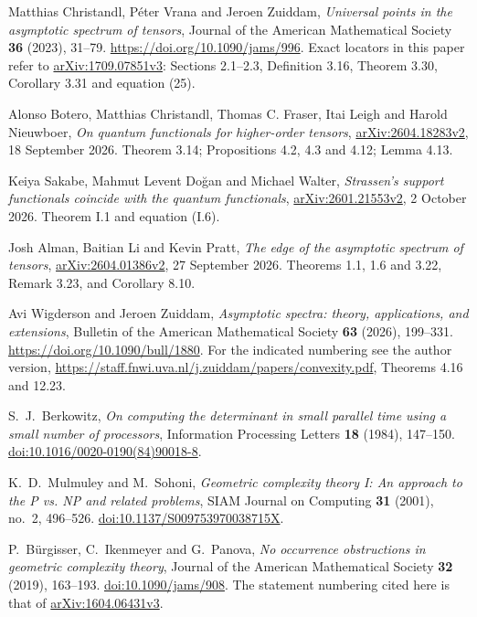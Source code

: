 Matthias Christandl, P\'eter Vrana and Jeroen Zuiddam, \emph{Universal points in the asymptotic spectrum of tensors}, Journal of the American Mathematical Society \textbf{36} (2023), 31--79. \url{https://doi.org/10.1090/jams/996}. Exact locators in this paper refer to \href{https://arxiv.org/abs/1709.07851v3}{arXiv:1709.07851v3}: Sections 2.1--2.3, Definition 3.16, Theorem 3.30, Corollary 3.31 and equation (25).

 Alonso Botero, Matthias Christandl, Thomas C. Fraser, Itai Leigh and Harold Nieuwboer, \emph{On quantum functionals for higher-order tensors}, \href{https://arxiv.org/abs/2604.18283v2}{arXiv:2604.18283v2}, 18 September 2026. Theorem 3.14; Propositions 4.2, 4.3 and 4.12; Lemma 4.13.

 Keiya Sakabe, Mahmut Levent Do\u gan and Michael Walter, \emph{Strassen's support functionals coincide with the quantum functionals}, \href{https://arxiv.org/abs/2601.21553v2}{arXiv:2601.21553v2}, 2 October 2026. Theorem I.1 and equation (I.6).

 Josh Alman, Baitian Li and Kevin Pratt, \emph{The edge of the asymptotic spectrum of tensors}, \href{https://arxiv.org/abs/2604.01386v2}{arXiv:2604.01386v2}, 27 September 2026. Theorems 1.1, 1.6 and 3.22, Remark 3.23, and Corollary 8.10.

 Avi Wigderson and Jeroen Zuiddam, \emph{Asymptotic spectra: theory, applications, and extensions}, Bulletin of the American Mathematical Society \textbf{63} (2026), 199--331. \url{https://doi.org/10.1090/bull/1880}. For the indicated numbering see the author version, \url{https://staff.fnwi.uva.nl/j.zuiddam/papers/convexity.pdf}, Theorems 4.16 and 12.23.

S.~J.~Berkowitz,
\emph{On computing the determinant in small parallel time using a small
number of processors},
Information Processing Letters \textbf{18} (1984), 147--150.
\href{https://doi.org/10.1016/0020-0190(84)90018-8}{doi:10.1016/0020-0190(84)90018-8}.

K.~D.~Mulmuley and M.~Sohoni,
\emph{Geometric complexity theory I: An approach to the P vs. NP and
related problems},
SIAM Journal on Computing \textbf{31} (2001), no.~2, 496--526.
\href{https://doi.org/10.1137/S009753970038715X}{doi:10.1137/S009753970038715X}.

P.~B\"urgisser, C.~Ikenmeyer and G.~Panova,
\emph{No occurrence obstructions in geometric complexity theory},
Journal of the American Mathematical Society \textbf{32} (2019), 163--193.
\href{https://doi.org/10.1090/jams/908}{doi:10.1090/jams/908}.
The statement numbering cited here is that of
\href{https://arxiv.org/abs/1604.06431v3}{arXiv:1604.06431v3}.

